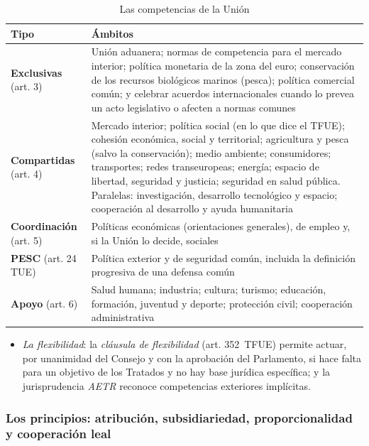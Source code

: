 \documentclass[11pt]{article}
\begin{document}
\begin{table}[H]
\centering
\caption{Las competencias de la Unión}\label{tab:competencias}
\small
\begin{tabular}{>{\raggedright\arraybackslash}m{3.4cm}>{\raggedright\arraybackslash}m{11.6cm}}
\hline
\textbf{Tipo} & \textbf{Ámbitos}\\
\hline
\textbf{Exclusivas} (art. 3) & Unión aduanera; normas de competencia para el mercado interior; política monetaria de la zona del euro; conservación de los recursos biológicos marinos (pesca); política comercial común; y celebrar acuerdos internacionales cuando lo prevea un acto legislativo o afecten a normas comunes\\
\textbf{Compartidas} (art. 4) & Mercado interior; política social (en lo que dice el TFUE); cohesión económica, social y territorial; agricultura y pesca (salvo la conservación); medio ambiente; consumidores; transportes; redes transeuropeas; energía; espacio de libertad, seguridad y justicia; seguridad en salud pública. Paralelas: investigación, desarrollo tecnológico y espacio; cooperación al desarrollo y ayuda humanitaria\\
\textbf{Coordinación} (art. 5) & Políticas económicas (orientaciones generales), de empleo y, si la Unión lo decide, sociales\\
\textbf{PESC} (art. 24 TUE) & Política exterior y de seguridad común, incluida la definición progresiva de una defensa común\\
\textbf{Apoyo} (art. 6) & Salud humana; industria; cultura; turismo; educación, formación, juventud y deporte; protección civil; cooperación administrativa\\
\hline
\end{tabular}
\end{table}

\begin{itemize}
\item \emph{La flexibilidad}: la \emph{cláusula de flexibilidad} (art. 352~TFUE) permite actuar, por unanimidad del Consejo y con la aprobación del Parlamento, si hace falta para un objetivo de los Tratados y no hay base jurídica específica; y la jurisprudencia \emph{AETR} reconoce competencias exteriores implícitas.
\end{itemize}

\subsubsection{Los principios: atribución, subsidiariedad, proporcionalidad y cooperación leal}\label{sec:principios}
\end{document}
